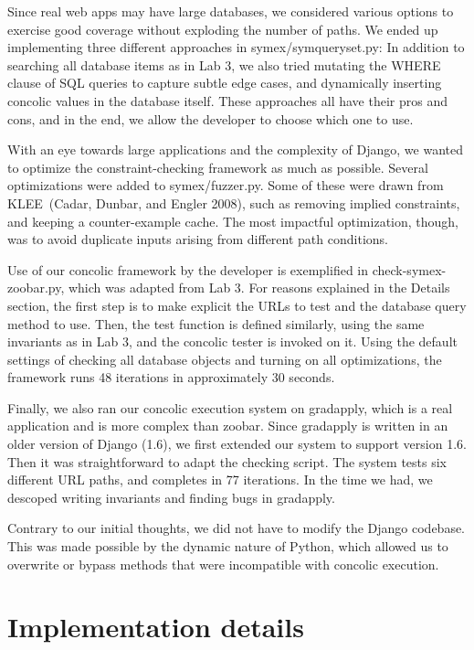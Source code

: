 \documentclass{scrartcl}
\begin{document}
Since real web apps may have large databases, we considered various
options to exercise good coverage without exploding the number of
paths. We ended up implementing three different approaches in
symex/symqueryset.py: In addition to searching all database items as
in Lab 3, we also tried mutating the WHERE clause of SQL queries to
capture subtle edge cases, and dynamically inserting concolic values
in the database itself. These approaches all have their pros and cons,
and in the end, we allow the developer to choose which one to use.

With an eye towards large applications and the complexity of Django,
we wanted to optimize the constraint-checking framework as much
as possible. Several optimizations were added to symex/fuzzer.py. Some
of these were drawn from KLEE~(Cadar, Dunbar, and Engler 2008), such
as removing implied constraints, and keeping a counter-example cache.
The most impactful optimization, though, was to avoid duplicate inputs
arising from different path conditions.

Use of our concolic framework by the developer is exemplified in
check-symex-zoobar.py, which was adapted from Lab 3. For reasons
explained in the Details section, the first step is to make explicit
the URLs to test and the database query method to use. Then, the test
function is defined similarly, using the same invariants as in Lab 3,
and the concolic tester is invoked on it. Using the default settings
of checking all database objects and turning on all optimizations, the
framework runs 48 iterations in approximately 30 seconds.

Finally, we also ran our concolic execution system on gradapply, which
is a real application and is more complex than zoobar. Since gradapply is
written in an older version of Django (1.6), we first extended our
system to support version 1.6. Then it was straightforward to adapt
the checking script. The system tests six different URL paths, and
completes in 77 iterations. In the time we had, we descoped writing
invariants and finding bugs in gradapply.

Contrary to our initial thoughts, we did not have to modify the
Django codebase. This was made possible by the dynamic nature of
Python, which allowed us to overwrite or bypass methods that were
incompatible with concolic execution.


\section{Implementation details}
\end{document}
